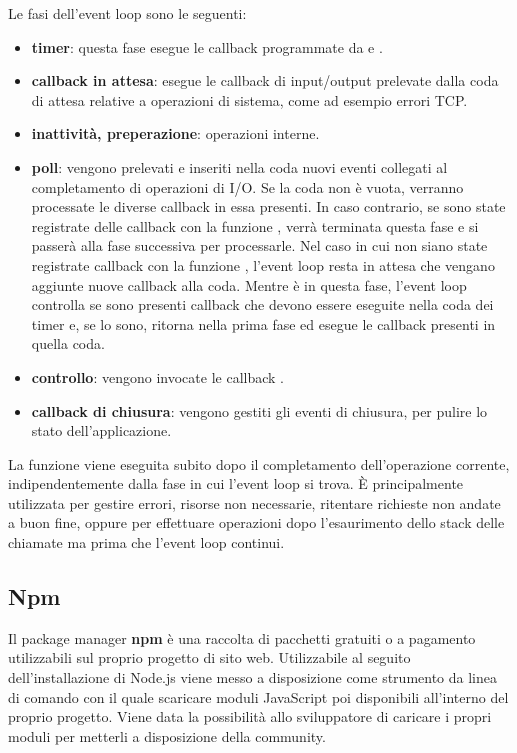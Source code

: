 Le fasi dell'event loop sono le seguenti:
\begin{itemize}
\item \textbf{timer}: questa fase esegue le callback programmate da  e .
\item \textbf{callback in attesa}: esegue le callback di input/output prelevate dalla coda di attesa relative a operazioni di sistema, come ad esempio errori TCP.
\item \textbf{inattività, preperazione}: operazioni interne.
\item \textbf{poll}: vengono prelevati e inseriti nella coda nuovi eventi collegati al completamento di operazioni di I/O. Se la coda non è vuota, verranno processate le diverse callback in essa presenti. In caso contrario, se sono state registrate delle callback con la funzione , verrà terminata questa fase e si passerà alla fase successiva per processarle. Nel caso in cui non siano state registrate callback con la funzione , l'event loop resta in attesa che vengano aggiunte nuove callback alla coda. Mentre è in questa fase, l'event loop controlla se sono presenti callback che devono essere eseguite nella coda dei timer e, se lo sono, ritorna nella prima fase ed esegue le callback presenti in quella coda.\cite{mrwebmaster}
\item \textbf{controllo}: vengono invocate le callback .
\item \textbf{callback di chiusura}: vengono gestiti gli eventi di chiusura, per pulire lo stato dell'applicazione.
\end{itemize}

La funzione  viene eseguita subito dopo il completamento dell'operazione corrente, indipendentemente dalla fase in cui l'event loop si trova. È principalmente utilizzata per gestire errori, risorse non necessarie, ritentare richieste non andate a buon fine, oppure per effettuare operazioni dopo l'esaurimento dello stack delle chiamate ma prima che l'event loop continui.\cite{node.js-eventloop}

\subsection{Npm}
Il package manager \textbf{npm} è una raccolta di pacchetti gratuiti o a pagamento utilizzabili sul proprio progetto di sito web.
Utilizzabile al seguito dell’installazione di Node.js viene messo a disposizione come strumento da linea di comando con il quale scaricare moduli JavaScript poi disponibili all’interno del proprio progetto. Viene data la possibilità allo sviluppatore di caricare i propri moduli per metterli a disposizione della community.

